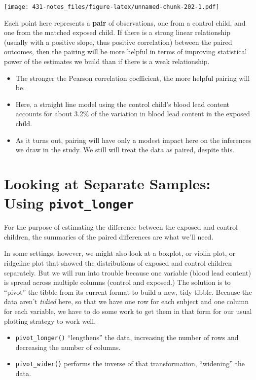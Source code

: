 \documentclass[
]{book}
\providecommand{\tightlist}{%
  \setlength{\itemsep}{0pt}\setlength{\parskip}{0pt}}
\begin{document}
\texttt{[image: 431-notes\_files/figure-latex/unnamed-chunk-202-1.pdf]}

Each point here represents a \textbf{pair} of observations, one from a control child, and one from the matched exposed child. If there is a strong linear relationship (usually with a positive slope, thus positive correlation) between the paired outcomes, then the pairing will be more helpful in terms of improving statistical power of the estimates we build than if there is a weak relationship.

\begin{itemize}
\tightlist
\item
  The stronger the Pearson correlation coefficient, the more helpful pairing will be.
\item
  Here, a straight line model using the control child's blood lead content accounts for about 3.2\% of the variation in blood lead content in the exposed child.
\item
  As it turns out, pairing will have only a modest impact here on the inferences we draw in the study. We still will treat the data as paired, despite this.
\end{itemize}

\hypertarget{looking-at-separate-samples-using-pivot_longer}{%
\section{\texorpdfstring{Looking at Separate Samples: Using \texttt{pivot\_longer}}{Looking at Separate Samples: Using pivot\_longer}}\label{looking-at-separate-samples-using-pivot_longer}}

For the purpose of estimating the difference between the exposed and control children, the summaries of the paired differences are what we'll need.

In some settings, however, we might also look at a boxplot, or violin plot, or ridgeline plot that showed the distributions of exposed and control children separately. But we will run into trouble because one variable (blood lead content) is spread across multiple columns (control and exposed.) The solution is to ``pivot'' the tibble from its current format to build a new, tidy tibble. Because the data aren't \emph{tidied} here, so that we have one row for each subject and one column for each variable, we have to do some work to get them in that form for our usual plotting strategy to work well.

\begin{itemize}
\tightlist
\item
  \texttt{pivot\_longer()} ``lengthens'' the data, increasing the number of rows and decreasing the number of columns.
\item
  \texttt{pivot\_wider()} performs the inverse of that transformation, ``widening'' the data.
\end{itemize}
\end{document}
